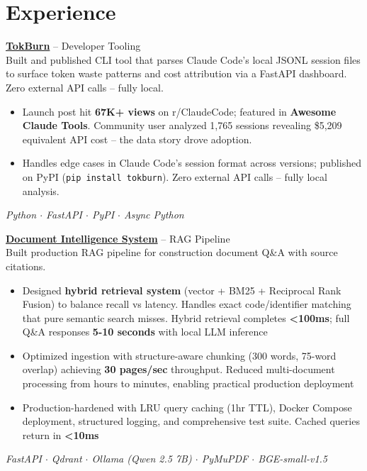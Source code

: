\documentclass[10pt,letterpaper]{article}
\newcommand{\headerlink}[2]{\href{#1}{#2}}
\begin{document}
\section*{Experience}

\textbf{\headerlink{https://github.com/lsvishaal/tokburn}{TokBurn}} -- Developer Tooling \\
Built and published CLI tool that parses Claude Code's local JSONL session files to surface token waste patterns and cost attribution via a FastAPI dashboard. Zero external API calls -- fully local.
\begin{itemize}
  \item Launch post hit \textbf{67K+ views} on r/ClaudeCode; featured in \textbf{Awesome Claude Tools}. Community user analyzed 1,765 sessions revealing \$5,209 equivalent API cost -- the data story drove adoption.
  \item Handles edge cases in Claude Code's session format across versions; published on PyPI (\texttt{pip install tokburn}). Zero external API calls -- fully local analysis.
\end{itemize}
\textit{Python $\cdot$ FastAPI $\cdot$ PyPI $\cdot$ Async Python}

\textbf{\headerlink{https://github.com/lsvishaal/constructure-rag}{Document Intelligence System}} -- RAG Pipeline \\
Built production RAG pipeline for construction document Q\&A with source citations.
\begin{itemize}
  \item Designed \textbf{hybrid retrieval system} (vector + BM25 + Reciprocal Rank Fusion) to balance recall vs latency. Handles exact code/identifier matching that pure semantic search misses. Hybrid retrieval completes \textbf{<100ms}; full Q\&A responses \textbf{5-10 seconds} with local LLM inference
  \item Optimized ingestion with structure-aware chunking (300 words, 75-word overlap) achieving \textbf{30 pages/sec} throughput. Reduced multi-document processing from hours to minutes, enabling practical production deployment
  \item Production-hardened with LRU query caching (1hr TTL), Docker Compose deployment, structured logging, and comprehensive test suite. Cached queries return in \textbf{<10ms}
\end{itemize}
\textit{FastAPI $\cdot$ Qdrant $\cdot$ Ollama (Qwen 2.5 7B) $\cdot$ PyMuPDF $\cdot$ BGE-small-v1.5}
\end{document}

